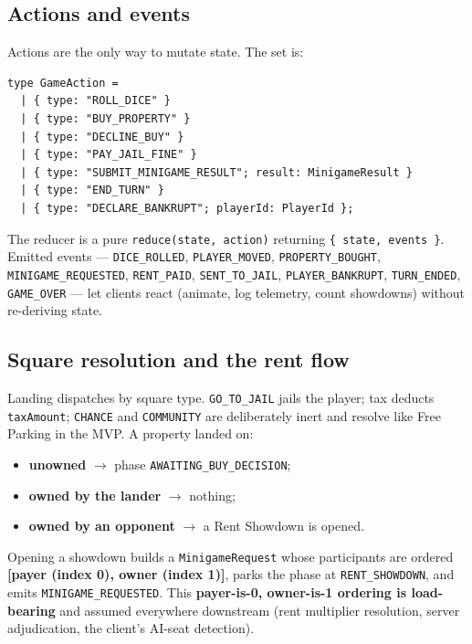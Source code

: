 \documentclass[11pt,a4paper]{article}
\newcommand{\code}[1]{\texttt{#1}}
\begin{document}
\subsection{Actions and events}
Actions are the only way to mutate state. The set is:
\begin{lstlisting}
type GameAction =
  | { type: "ROLL_DICE" }
  | { type: "BUY_PROPERTY" }
  | { type: "DECLINE_BUY" }
  | { type: "PAY_JAIL_FINE" }
  | { type: "SUBMIT_MINIGAME_RESULT"; result: MinigameResult }
  | { type: "END_TURN" }
  | { type: "DECLARE_BANKRUPT"; playerId: PlayerId };
\end{lstlisting}

The reducer is a pure \code{reduce(state, action)} returning
\code{\{ state, events \}}. Emitted events --- \code{DICE\_ROLLED},
\code{PLAYER\_MOVED}, \code{PROPERTY\_BOUGHT}, \code{MINIGAME\_REQUESTED},
\code{RENT\_PAID}, \code{SENT\_TO\_JAIL}, \code{PLAYER\_BANKRUPT},
\code{TURN\_ENDED}, \code{GAME\_OVER} --- let clients react (animate, log
telemetry, count showdowns) without re-deriving state.

\subsection{Square resolution and the rent flow}
Landing dispatches by square type. \code{GO\_TO\_JAIL} jails the player; tax
deducts \code{taxAmount}; \code{CHANCE} and \code{COMMUNITY} are deliberately
inert and resolve like Free Parking in the MVP. A property landed on:
\begin{itemize}[leftmargin=1.4em,nosep]
  \item \textbf{unowned} $\to$ phase \code{AWAITING\_BUY\_DECISION};
  \item \textbf{owned by the lander} $\to$ nothing;
  \item \textbf{owned by an opponent} $\to$ a Rent Showdown is opened.
\end{itemize}
Opening a showdown builds a \code{MinigameRequest} whose participants are
ordered \textbf{[payer (index 0), owner (index 1)]}, parks the phase at
\code{RENT\_SHOWDOWN}, and emits \code{MINIGAME\_REQUESTED}. This
\textbf{payer-is-0, owner-is-1 ordering is load-bearing} and assumed everywhere
downstream (rent multiplier resolution, server adjudication, the client's
AI-seat detection).
\end{document}
